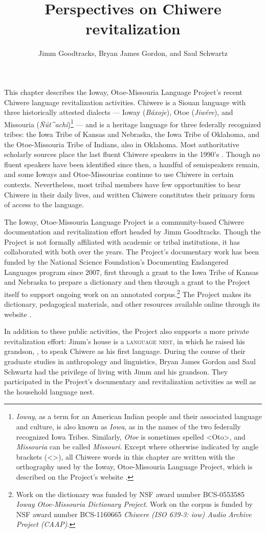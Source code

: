 \documentclass[output=paper]{LSP/langsci}
\author{Jimm Goodtracks, Bryan James Gordon, and Saul Schwartz}
\title{Perspectives on Chiwere revitalization}
\begin{document}
This chapter describes the Ioway, Otoe-Missouria Language Project's recent Chiwere language revitalization activities. Chiwere is a Siouan language with three historically attested dialects --- Ioway (\emph{B\'axoje}), Otoe (\emph{Jiw\'ere}), and Missouria (\emph{\~N\'ut\^{ }achi})\footnote{\emph{Ioway}, as a term for an American Indian people and their associated language and culture, is also known as \emph{Iowa}, as in the names of the two federally recognized Iowa Tribes. Similarly, \emph{Otoe} is sometimes spelled <Oto>, and \emph{Missouria} can be called \emph{Missouri}. Except where otherwise indicated by angle brackets (<>), all Chiwere words in this chapter are written with the orthography used by the Ioway, Otoe-Missouria Language Project, which is described on the Project's website \citep{GoodtracksND}.} --- and is a heritage language for three federally recognized tribes: the Iowa Tribe of Kansas and Nebraska, the Iowa Tribe of Oklahoma, and the Otoe-Missouria Tribe of Indians, also in Oklahoma. Most authoritative scholarly sources place the last fluent Chiwere speakers in the 1990's \citep{LewisSimonsFennig2013, ParksRankin2001}. Though no fluent speakers have been identified since then, a handful of semispeakers remain, and some Ioways and Otoe-Missourias continue to use Chiwere in certain contexts. Nevertheless, most tribal members have few opportunities to hear Chiwere in their daily lives, and written Chiwere constitutes their primary form of access to the language.

The Ioway, Otoe-Missouria Language Project is a community-based Chiwere documentation and revitalization effort headed by Jimm Goodtracks. Though the Project is not formally affiliated with academic or tribal institutions, it has collaborated with both over the years. The Project's documentary work has been funded by the National Science Foundation's Documenting Endangered Languages program since 2007, first through a grant to the Iowa Tribe of Kansas and Nebraska to prepare a dictionary and then through a grant to the Project itself to support ongoing work on an annotated corpus.\footnote{Work on the dictionary was funded by NSF award number BCS-0553585 \emph{Ioway Otoe-Missouria Dictionary Project}. Work on the corpus is funded by NSF award number BCS-1160665 \emph{Chiwere (ISO 639-3: iow) Audio Archive Project (CAAP)}.}  The Project makes its dictionary, pedagogical materials, and other resources available online through its website \citep{GoodtracksND}.

In addition to these public activities, the Project also supports a more private revitalization effort: Jimm's house is a \textsc{language nest}, in which he raised his grandson, , to speak Chiwere as his first language. During the course of their graduate studies in anthropology and linguistics, Bryan James Gordon and Saul Schwartz had the privilege of living with Jimm and his grandson. They participated in the Project's documentary and revitalization activities as well as the household language nest.
\end{document}
